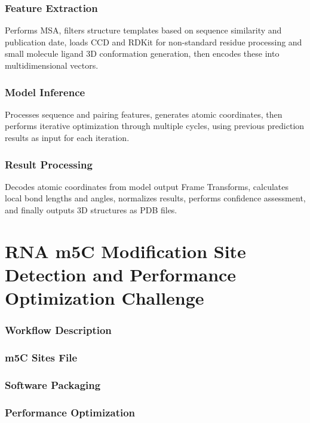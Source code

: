 \documentclass[a4paper,12pt]{article}
\begin{document}
\subsubsection{Feature Extraction}
Performs MSA, filters structure templates based on sequence similarity and publication date, loads CCD and RDKit for non-standard residue processing and small molecule ligand 3D conformation generation, then encodes these into multidimensional vectors.

\subsubsection{Model Inference}
Processes sequence and pairing features, generates atomic coordinates, then performs iterative optimization through multiple cycles, using previous prediction results as input for each iteration.

\subsubsection{Result Processing}
Decodes atomic coordinates from model output Frame Transforms, calculates local bond lengths and angles, normalizes results, performs confidence assessment, and finally outputs 3D structures as PDB files.

\newpage

\section{RNA m5C Modification Site Detection and Performance Optimization Challenge}

\subsubsection{Workflow Description}

\subsubsection{m5C Sites File}

\subsubsection{Software Packaging}

\subsubsection{Performance Optimization}
\end{document}

